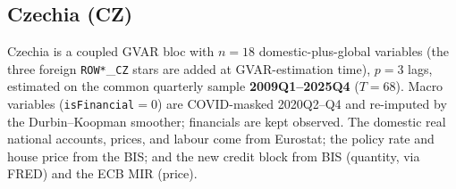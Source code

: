 
\subsection{Czechia (CZ)}\label{sec:data:CZ}
Czechia is a coupled GVAR bloc with $n=18$ domestic-plus-global
variables (the three foreign \texttt{ROW*}\_\texttt{CZ} stars are added
at GVAR-estimation time), $p=3$ lags, estimated on the common quarterly
sample \textbf{2009Q1--2025Q4} ($T=68$).  Macro variables
(\texttt{isFinancial}$=0$) are COVID-masked 2020Q2--Q4 and re-imputed by
the Durbin--Koopman smoother; financials are kept observed.  The
domestic real national accounts, prices, and labour come from Eurostat;
the policy rate and house price from the BIS; and the new credit block
from BIS (quantity, via FRED) and the ECB MIR (price).

